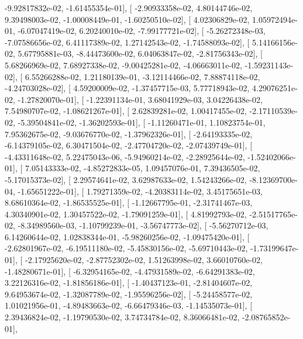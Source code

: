\documentclass{article}
\begin{document}
         -9.92817832e-02,  -1.61455354e-01],
       [ -2.90933358e-02,   4.80144746e-02,   9.39498003e-02,
         -1.00008449e-01,  -1.60250510e-02],
       [  4.02306829e-02,   1.05972494e-01,  -6.07047419e-02,
          6.20240010e-02,  -7.99177721e-02],
       [ -5.26272348e-03,  -7.07586656e-02,   6.41117389e-02,
          1.27142543e-02,  -1.74588093e-02],
       [  5.14166156e-02,   5.67795881e-03,  -8.44473600e-02,
          6.04063847e-02,  -2.81756343e-02],
       [  5.68266969e-02,   7.68927338e-02,  -9.00425281e-02,
         -4.06663011e-02,  -1.59231143e-02],
       [  6.55266288e-02,   1.21180139e-01,  -3.12114466e-02,
          7.88874118e-02,  -4.24703028e-02],
       [  4.59200009e-02,  -1.37457715e-03,   5.77718943e-02,
          4.29076251e-02,  -1.27820070e-01],
       [ -1.22391134e-01,   3.68041929e-03,   3.04226438e-02,
          7.54980707e-02,  -1.08621267e-01],
       [  2.62839281e-02,   1.00417455e-02,  -2.17110539e-02,
         -5.39504841e-02,  -1.36202593e-01],
       [ -1.11260471e-01,   1.10823754e-01,   7.95362675e-02,
         -9.03676770e-02,  -1.37962326e-01],
       [ -2.64193335e-02,  -6.14379105e-02,   6.30471504e-02,
         -2.47704720e-02,  -2.07439749e-01],
       [ -4.43311648e-02,   5.22475043e-06,  -5.94960214e-02,
         -2.28925644e-02,  -1.52402066e-01],
       [  7.05143333e-02,  -4.85272833e-05,   1.09457076e-01,
          7.39436505e-02,  -5.17015373e-02],
       [  2.29574641e-02,   3.62987633e-02,   1.54243266e-02,
         -8.12369700e-04,  -1.65651222e-01],
       [  1.79271359e-02,  -4.20383114e-02,   3.45175651e-03,
          8.68610364e-02,  -1.86535525e-01],
       [ -1.12667795e-01,  -2.31741467e-03,   4.30340901e-02,
          1.30457522e-02,  -1.79091259e-01],
       [  4.81992793e-02,  -2.51517765e-02,  -8.34989560e-03,
         -1.10799239e-01,  -3.56747773e-02],
       [ -5.56270712e-03,   6.14260644e-02,   1.02838344e-01,
         -5.98260256e-02,  -1.09475420e-01],
       [ -2.62801967e-02,  -6.19511180e-02,  -5.45830156e-02,
         -5.69710443e-02,  -1.73199647e-01],
       [ -2.17925620e-02,  -2.87752302e-02,   1.51263998e-02,
          3.66010760e-02,  -1.48280671e-01],
       [ -6.32954165e-02,  -4.47931589e-02,  -6.64291383e-02,
          3.22126316e-02,  -1.81856186e-01],
       [ -1.40437123e-01,  -2.81404607e-02,   9.64953674e-02,
         -1.32087789e-02,  -1.95596256e-02],
       [ -5.24458577e-02,   1.01021956e-01,  -4.89483663e-02,
         -6.66479346e-03,  -1.14535073e-01],
       [  2.39436824e-02,  -1.19790530e-02,   3.74734784e-02,
          8.36066481e-02,  -2.08765852e-01],
\end{document}
